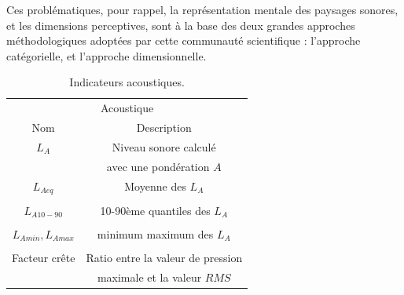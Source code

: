 Ces problématiques, pour rappel, la représentation mentale des paysages sonores, et les dimensions perceptives, sont à la base des deux grandes approches méthodologiques adoptées par cette communauté scientifique : l'approche catégorielle, et l'approche dimensionnelle.  \\


\begin{table}[t]
\centering
\begin{tabular}{c c} 
\multicolumn{2}{c}{Acoustique} \\ 
Nom                           & Description            \\                                                            
\hline
$L_{A}$                                   & Niveau sonore calculé      \\
                                          & avec une pondération $A$\\
$L_{Aeq}$                                 & Moyenne des $L_A$     \\
                                          &         \\
$L_{A10-90}$                              & 10-90ème quantiles des $L_A$     \\
                                          &         \\
$L_{Amin}, L_{Amax}$                      & minimum maximum des $L_A$    \\
                                          &         \\
Facteur crête                             & Ratio entre la valeur de pression     \\
                                          & maximale et la valeur $RMS$        \\                                          
\hline
\end{tabular}
\vspace{0.5mm}
\caption{Indicateurs acoustiques.}
\label{tab:acousIndi}
\end{table}

